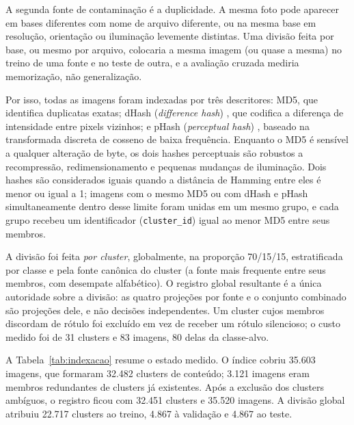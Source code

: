 \documentclass[11pt,a4paper]{article}
\begin{document}
	A segunda fonte de contaminação é a duplicidade. A mesma foto pode aparecer em bases diferentes com nome de arquivo diferente, ou na mesma base em resolução, orientação ou iluminação levemente distintas. Uma divisão feita por base, ou mesmo por arquivo, colocaria a mesma imagem (ou quase a mesma) no treino de uma fonte e no teste de outra, e a avaliação cruzada mediria memorização, não generalização.
	
	Por isso, todas as imagens foram indexadas por três descritores: MD5, que identifica duplicatas exatas; dHash (\emph{difference hash}) \cite{krawetz2013}, que codifica a diferença de intensidade entre pixels vizinhos; e pHash (\emph{perceptual hash}) \cite{zauner2010}, baseado na transformada discreta de cosseno de baixa frequência. Enquanto o MD5 é sensível a qualquer alteração de byte, os dois hashes perceptuais são robustos a recompressão, redimensionamento e pequenas mudanças de iluminação. Dois hashes são considerados iguais quando a distância de Hamming entre eles é menor ou igual a 1; imagens com o mesmo MD5 ou com dHash e pHash simultaneamente dentro desse limite foram unidas em um mesmo grupo, e cada grupo recebeu um identificador (\texttt{cluster\_id}) igual ao menor MD5 entre seus membros.
	
	A divisão foi feita \emph{por cluster}, globalmente, na proporção 70/15/15, estratificada por classe e pela fonte canônica do cluster (a fonte mais frequente entre seus membros, com desempate alfabético). O registro global resultante é a única autoridade sobre a divisão: as quatro projeções por fonte e o conjunto combinado são projeções dele, e não decisões independentes. Um cluster cujos membros discordam de rótulo foi excluído em vez de receber um rótulo silencioso; o custo medido foi de 31 clusters e 83 imagens, 80 delas da classe-alvo.
	
	A Tabela~\ref{tab:indexacao} resume o estado medido. O índice cobriu 35.603 imagens, que formaram 32.482 clusters de conteúdo; 3.121 imagens eram membros redundantes de clusters já existentes. Após a exclusão dos clusters ambíguos, o registro ficou com 32.451 clusters e 35.520 imagens. A divisão global atribuiu 22.717 clusters ao treino, 4.867 à validação e 4.867 ao teste.
	
\end{document}

